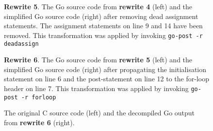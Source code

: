 \begin{figure}[htbp]
	\centering
	\begin{subfigure}[t]{0.45\textwidth}
		
	\end{subfigure}
	\qquad
	\begin{subfigure}[t]{0.45\textwidth}
		
	\end{subfigure}
	\caption{\textbf{Rewrite 5}. The Go source code from \textbf{rewrite 4} (left) and the simplified Go source code (right) after removing dead assignment statements. The assignment statements on line 9 and 14 have been removed. This transformation was applied by invoking \texttt{go-post -r deadassign}}
	\label{fig:rewrite_5}
\end{figure}

\begin{figure}[htbp]
	\centering
	\begin{subfigure}[t]{0.45\textwidth}
		
	\end{subfigure}
	\qquad
	\begin{subfigure}[t]{0.45\textwidth}
		
	\end{subfigure}
	\caption{\textbf{Rewrite 6}. The Go source code from \textbf{rewrite 5} (left) and the simplified Go source code (right) after propagating the initialisation statement on line 6 and the post-statement on line 12 to the for-loop header on line 7. This transformation was applied by invoking \texttt{go-post -r forloop}}
	\label{fig:rewrite_6}
\end{figure}

\begin{figure}[htbp]
	\centering
	\begin{subfigure}[t]{0.49\textwidth}
		
	\end{subfigure}
	\qquad
	\begin{subfigure}[t]{0.43\textwidth}
		
	\end{subfigure}
	\caption{The original C source code (left) and the decompiled Go output from \textbf{rewrite 6} (right).}
	\label{fig:example1_comparison}
\end{figure}
